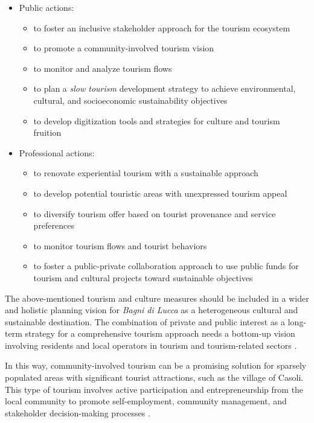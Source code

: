 \documentclass[sustainability,article,submit,pdftex,moreauthors]{Definitions/mdpi}
\begin{document}
\begin{itemize}

\item Public actions: 
\begin{itemize}
\item to foster an inclusive stakeholder approach for the tourism ecosystem 
\item to promote a community-involved tourism vision 
\item to monitor and analyze tourism flows 
\item to plan a \emph{slow tourism} development strategy to achieve environmental, cultural, and socioeconomic sustainability objectives 
\item to develop digitization tools and strategies for culture and tourism fruition
\end{itemize}

\item Professional actions: 
\begin{itemize}
\item to renovate experiential tourism with a sustainable approach 
\item to develop potential touristic areas with unexpressed tourism appeal 
\item to diversify tourism offer based on tourist provenance and service preferences 
\item to monitor tourism flows and tourist behaviors 
\item to foster a public-private collaboration approach to use public funds for tourism and cultural projects toward sustainable objectives 
\end{itemize}

\end{itemize}

The above-mentioned tourism and culture measures should be included in a wider and holistic planning vision for \emph{Bagni di Lucca} as a heterogeneous cultural and sustainable destination. The combination of private and public interest as a long-term strategy for a comprehensive tourism approach needs a bottom-up vision involving residents and local operators in tourism and tourism-related sectors \cite{lem20, lem22}.

In this way, community-involved tourism can be a promising solution for sparsely populated areas with significant tourist attractions, such as the village of Casoli. This type of tourism involves active participation and entrepreneurship from the local community to promote self-employment, community management, and stakeholder decision-making processes \cite{nag15}.
\end{document}
